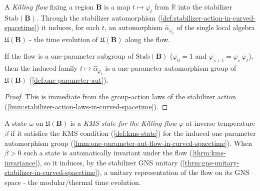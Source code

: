 \begin{definition}
    \label{def:flow-aut-in-curved-spacetime}
    \leanok
    A \emph{Killing flow} fixing a region $\mathbf{B}$ is a map $t \mapsto \varphi_t$ from $\mathbb{R}$ into the stabilizer $\mathrm{Stab}(\mathbf{B})$. Through the stabilizer automorphism (\ref{def:stabilizer-action-in-curved-spacetime}) it induces, for each $t$, an automorphism $\hat\alpha_{\varphi_t}$ of the single local algebra $\mathfrak{U}(\mathbf{B})$ - the time evolution of $\mathfrak{U}(\mathbf{B})$ along the flow.
\end{definition}

\begin{lemma}
    \label{lmm:one-parameter-aut-flow-in-curved-spacetime}
    \leanok
    If the flow is a one-parameter subgroup of $\mathrm{Stab}(\mathbf{B})$ ($\varphi_0 = 1$ and $\varphi_{s+t} = \varphi_s\,\varphi_t$), then the induced family $t \mapsto \hat\alpha_{\varphi_t}$ is a one-parameter automorphism group of $\mathfrak{U}(\mathbf{B})$ (\ref{def:one-parameter-aut}).
\end{lemma}
\begin{proof}
    \leanok
    This is immediate from the group-action laws of the stabilizer action (\ref{lmm:stabilizer-action-laws-in-curved-spacetime}).
\end{proof}

\begin{definition}
    \label{def:kms-state-for-flow-in-curved-spacetime}
    \leanok
    A state $\omega$ on $\mathfrak{U}(\mathbf{B})$ is a \emph{KMS state for the Killing flow} $\varphi$ at inverse temperature $\beta$ if it satisfies the KMS condition (\ref{def:kms-state}) for the induced one-parameter automorphism group (\ref{lmm:one-parameter-aut-flow-in-curved-spacetime}). When $\beta > 0$ such a state is automatically invariant under the flow (\ref{thrm:kms-invariance}), so it induces, by the stabilizer GNS unitary (\ref{thrm:gns-unitary-stabilizer-in-curved-spacetime}), a unitary representation of the flow on its GNS space - the modular/thermal time evolution.
\end{definition}

